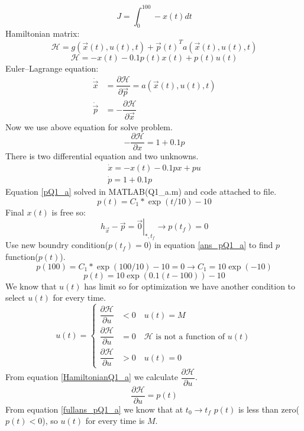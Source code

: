 $$J = \int_0^{100}-x(t)dt$$
Hamiltonian matrix:
$$\mathcal{H} =  g(\vec x(t), u(t), t) + {\vec{p}(t)}^Ta(\vec x(t), u(t), t)$$
\begin{equation} \label{HamiltonianQ1_a}
\mathcal{H} = -x(t) -0.1p(t)x(t)+p(t)u(t)
\end{equation}
Euler–Lagrange equation:
\begin{align}
\dot{\vec{x}} &= \dfrac{\partial \mathcal{H} }{\partial \vec{p}} = a(\vec x(t), u(t), t)\\
\dot{\vec{p}} &= -\dfrac{\partial \mathcal{H} }{\partial \vec{x}}
\end{align}
Now we use above equation for solve problem.
$$-\dfrac{\partial \mathcal{H} }{\partial x} = 1 + 0.1p$$
There is two differential equation and two unknowns.
\begin{align}
\dot x = -x(t) -0.1px+pu\\
\dot p = 1 + 0.1p\label{pQ1_a}
\end{align}
Equation \ref{pQ1_a} solved in MATLAB(Q1\_a.m) and code attached to file.
\begin{equation} \label{ans_pQ1_a}
p(t) = C_1*\exp(t/10) - 10
\end{equation}
Final $x(t)$ is free so:
$$ \left .h_{\vec x} - \vec{p} = \vec{0} \right \vert_{*, t_f} \to p(t_f) = 0$$
Use new boundry condition($p(t_f) = 0$) in equation \ref{ans_pQ1_a} to find $p$ function($p(t)$).
$$p(100) = C_1*\exp(100/10) - 10  = 0\to C_1 = 10\exp(-10)$$
\begin{equation} \label{fullans_pQ1_a}
p(t) = 10\exp \left(0.1(t-100)\right)-10
\end{equation}
We know that $u(t)$ has limit so for optimization we have another condition to select $u(t)$ for every time.
\begin{equation} \label{HConditionQ1_a}
u(t) = 
  \begin{cases}
	\dfrac{\partial \mathcal{H} }{\partial u}  & < 0\quad u(t) = M\\[10pt]
	\dfrac{\partial \mathcal{H} }{\partial u}  & = 0\quad  \mathcal{H} \text{ is not a function of }u(t) \\[10pt]
	\dfrac{\partial \mathcal{H} }{\partial u}  & > 0 \quad u(t) = 0
  \end{cases}
\end{equation}
From equation \ref{HamiltonianQ1_a} we calculate $\dfrac{\partial \mathcal{H} }{\partial u}$.
$$\dfrac{\partial \mathcal{H} }{\partial u} = p(t)$$
From equation \ref{fullans_pQ1_a} we know that at $t_0 \to t_f$ $p(t)$ is less than zero($p(t) < 0$), so $u(t)$ for every time is $M$.
